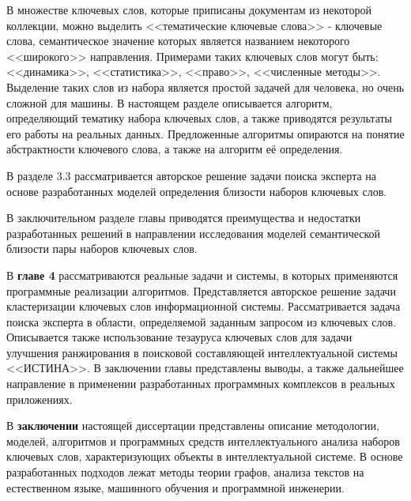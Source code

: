 В множестве ключевых слов, которые приписаны документам из некоторой коллекции, можно выделить <<тематические ключевые слова>> - ключевые слова, семантическое значение которых является названием некоторого <<широкого>> направления. Примерами таких ключевых слов могут быть: <<динамика>>, <<статистика>>, <<право>>, <<численные методы>>. Выделение таких слов из набора является простой задачей для человека, но очень сложной для машины. В настоящем разделе описывается алгоритм, определяющий тематику набора ключевых слов, а также приводятся результаты его работы на реальных данных. Предложенные алгоритмы опираются на понятие абстрактности ключевого слова, а также на алгоритм её определения.


В разделе 3.3 рассматривается авторское решение задачи поиска эксперта на основе разработанных моделей определения близости наборов ключевых слов.

В заключительном разделе главы приводятся преимущества и недостатки разработанных решений в направлении исследования моделей семантической близости пары наборов ключевых слов.

В \textbf{главе 4} рассматриваются реальные задачи и системы, в которых применяются программные реализации алгоритмов. 
Представляется авторское решение задачи кластеризации ключевых слов информационной системы.
Рассматривается задача поиска эксперта в области, определяемой заданным запросом из ключевых слов.
Описывается также использование тезауруса ключевых слов для задачи улучшения ранжирования в поисковой составляющей интеллектуальной системы <<ИСТИНА>>.
В заключении главы представлены выводы, а также дальнейшее направление в применении разработанных программных комплексов в реальных приложениях.



В \textbf{заключении} настоящей диссертации представлены описание методологии, моделей, алгоритмов и программных средств интеллектуального анализа наборов ключевых слов, характеризующих объекты в интеллектуальной системе. В основе разработанных подходов лежат методы теории графов, анализа текстов на естественном языке, машинного обучения и программной инженерии.

